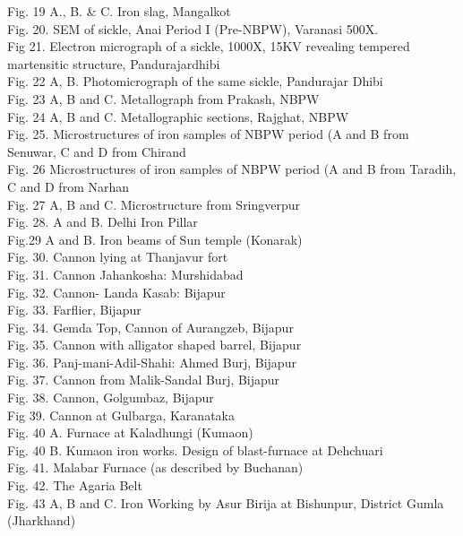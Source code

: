 \begin{myquote}
Fig. 19 A., B. \& C. Iron slag, Mangalkot \\[.2cm]
Fig. 20. SEM of sickle, Anai Period I (Pre-NBPW), Varanasi 500X.\\[.2cm]
Fig 21. Electron micrograph of a sickle, 1000X, 15KV revealing tempered martensitic structure, Pandurajardhibi\\[.2cm] 
Fig. 22 A, B. Photomicrograph of the same sickle, Pandurajar Dhibi \\[.2cm]
Fig. 23 A, B and C. Metallograph from Prakash, NBPW \\[.2cm] 
Fig. 24 A, B and C. Metallographic sections, Rajghat, NBPW\\[.2cm]
Fig. 25. Microstructures of iron samples of NBPW period (A and B from Senuwar, C and D from Chirand\\[.2cm]
Fig. 26 Microstructures of iron samples of NBPW period (A and B from Taradih, C and D from Narhan\\[.2cm]
Fig. 27 A, B and C. Microstructure from Sringverpur \\[.2cm]
Fig. 28. A and B. Delhi Iron Pillar\\[.2cm] 
Fig.29 A and B. Iron beams of Sun temple  (Konarak)\\[.2cm]
Fig. 30. Cannon lying at Thanjavur fort  \\[.2cm]
Fig. 31. Cannon Jahankosha: Murshidabad \\[.2cm]
Fig. 32. Cannon- Landa Kasab: Bijapur \\[.2cm]
Fig. 33. Farflier, Bijapur \\[.2cm]
Fig. 34. Gemda Top, Cannon of Aurangzeb, Bijapur \\[.2cm]
Fig. 35. Cannon with alligator shaped barrel, Bijapur \\[.2cm]
Fig. 36. Panj-mani-Adil-Shahi: Ahmed Burj, Bijapur \\[.2cm]
Fig. 37. Cannon from Malik-Sandal Burj, Bijapur\\[.2cm] 
Fig. 38. Cannon, Golgumbaz, Bijapur \\[.2cm]
Fig 39. Cannon at Gulbarga, Karanataka \\[.2cm]
Fig. 40 A. Furnace at Kaladhungi (Kumaon)\\[.2cm]
Fig. 40 B. Kumaon iron works. Design of blast-furnace at Dehchuari \\[.2cm]
Fig. 41. Malabar Furnace (as described by Buchanan)\\[.2cm]
Fig. 42. The Agaria Belt \\[.2cm]
Fig. 43 A, B and C. Iron Working by Asur Birija at Bishunpur, District Gumla (Jharkhand) \\[.2cm]

\end{myquote}
